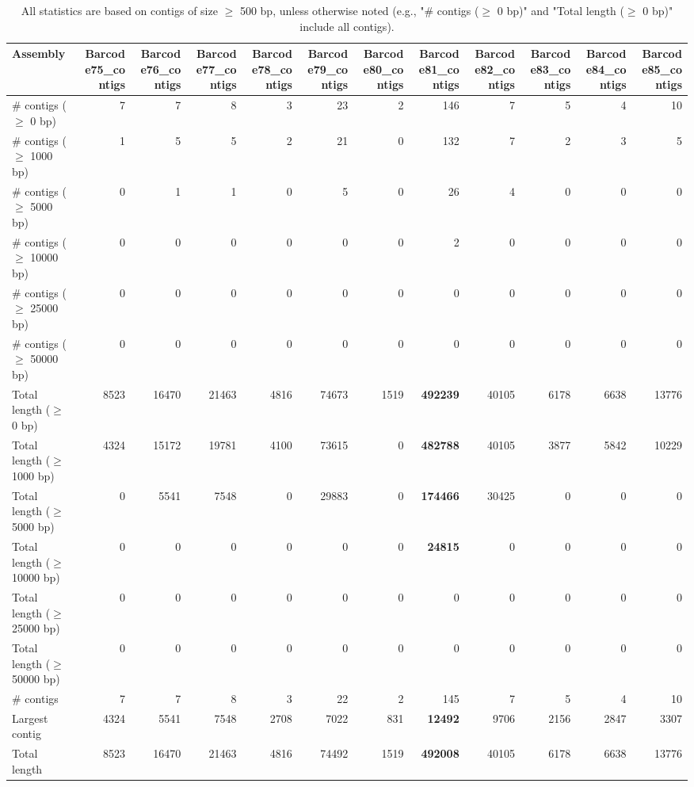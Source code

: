 \documentclass[12pt,a4paper]{article}
\begin{document}
\begin{table}[ht]
\begin{center}
\caption{All statistics are based on contigs of size $\geq$ 500 bp, unless otherwise noted (e.g., "\# contigs ($\geq$ 0 bp)" and "Total length ($\geq$ 0 bp)" include all contigs).}
\begin{tabular}{|l*{11}{|r}|}
\hline
Assembly & Barcode75\_contigs & Barcode76\_contigs & Barcode77\_contigs & Barcode78\_contigs & Barcode79\_contigs & Barcode80\_contigs & Barcode81\_contigs & Barcode82\_contigs & Barcode83\_contigs & Barcode84\_contigs & Barcode85\_contigs \\ \hline
\# contigs ($\geq$ 0 bp) & 7 & 7 & 8 & 3 & 23 & 2 & 146 & 7 & 5 & 4 & 10 \\ \hline
\# contigs ($\geq$ 1000 bp) & 1 & 5 & 5 & 2 & 21 & 0 & 132 & 7 & 2 & 3 & 5 \\ \hline
\# contigs ($\geq$ 5000 bp) & 0 & 1 & 1 & 0 & 5 & 0 & 26 & 4 & 0 & 0 & 0 \\ \hline
\# contigs ($\geq$ 10000 bp) & 0 & 0 & 0 & 0 & 0 & 0 & 2 & 0 & 0 & 0 & 0 \\ \hline
\# contigs ($\geq$ 25000 bp) & 0 & 0 & 0 & 0 & 0 & 0 & 0 & 0 & 0 & 0 & 0 \\ \hline
\# contigs ($\geq$ 50000 bp) & 0 & 0 & 0 & 0 & 0 & 0 & 0 & 0 & 0 & 0 & 0 \\ \hline
Total length ($\geq$ 0 bp) & 8523 & 16470 & 21463 & 4816 & 74673 & 1519 & {\bf 492239} & 40105 & 6178 & 6638 & 13776 \\ \hline
Total length ($\geq$ 1000 bp) & 4324 & 15172 & 19781 & 4100 & 73615 & 0 & {\bf 482788} & 40105 & 3877 & 5842 & 10229 \\ \hline
Total length ($\geq$ 5000 bp) & 0 & 5541 & 7548 & 0 & 29883 & 0 & {\bf 174466} & 30425 & 0 & 0 & 0 \\ \hline
Total length ($\geq$ 10000 bp) & 0 & 0 & 0 & 0 & 0 & 0 & {\bf 24815} & 0 & 0 & 0 & 0 \\ \hline
Total length ($\geq$ 25000 bp) & 0 & 0 & 0 & 0 & 0 & 0 & 0 & 0 & 0 & 0 & 0 \\ \hline
Total length ($\geq$ 50000 bp) & 0 & 0 & 0 & 0 & 0 & 0 & 0 & 0 & 0 & 0 & 0 \\ \hline
\# contigs & 7 & 7 & 8 & 3 & 22 & 2 & 145 & 7 & 5 & 4 & 10 \\ \hline
Largest contig & 4324 & 5541 & 7548 & 2708 & 7022 & 831 & {\bf 12492} & 9706 & 2156 & 2847 & 3307 \\ \hline
Total length & 8523 & 16470 & 21463 & 4816 & 74492 & 1519 & {\bf 492008} & 40105 & 6178 & 6638 & 13776 \\ \hline

\end{tabular}
\end{center}
\end{table}
\end{document}
